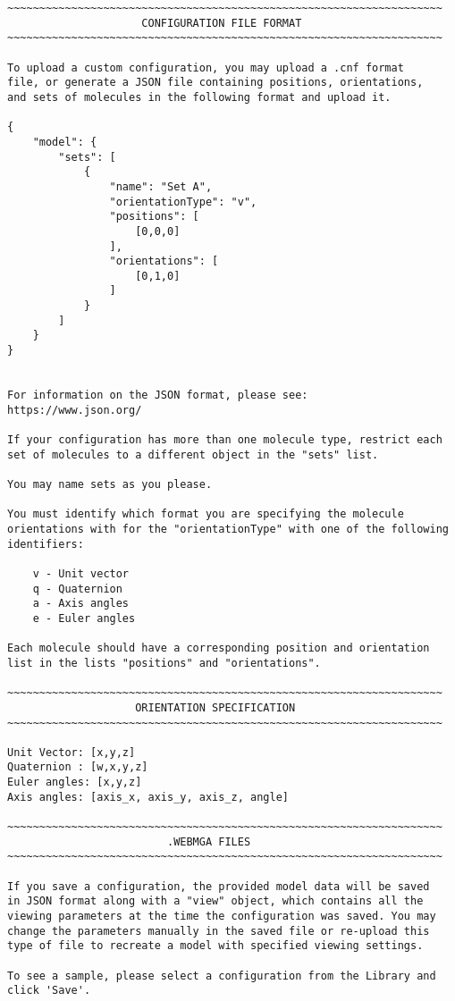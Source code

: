 \begin{verbatim}
~~~~~~~~~~~~~~~~~~~~~~~~~~~~~~~~~~~~~~~~~~~~~~~~~~~~~~~~~~~~~~~~~~~~
                     CONFIGURATION FILE FORMAT
~~~~~~~~~~~~~~~~~~~~~~~~~~~~~~~~~~~~~~~~~~~~~~~~~~~~~~~~~~~~~~~~~~~~

To upload a custom configuration, you may upload a .cnf format
file, or generate a JSON file containing positions, orientations,
and sets of molecules in the following format and upload it.

{
    "model": {
        "sets": [
            {
                "name": "Set A",
                "orientationType": "v",
                "positions": [
                    [0,0,0]
                ],
                "orientations": [
                    [0,1,0]
                ]
            }
        ]
    }
}


For information on the JSON format, please see:
https://www.json.org/

If your configuration has more than one molecule type, restrict each
set of molecules to a different object in the "sets" list.

You may name sets as you please.

You must identify which format you are specifying the molecule
orientations with for the "orientationType" with one of the following
identifiers:

	v - Unit vector
	q - Quaternion
	a - Axis angles
	e - Euler angles

Each molecule should have a corresponding position and orientation
list in the lists "positions" and "orientations".

~~~~~~~~~~~~~~~~~~~~~~~~~~~~~~~~~~~~~~~~~~~~~~~~~~~~~~~~~~~~~~~~~~~~
                    ORIENTATION SPECIFICATION
~~~~~~~~~~~~~~~~~~~~~~~~~~~~~~~~~~~~~~~~~~~~~~~~~~~~~~~~~~~~~~~~~~~~

Unit Vector: [x,y,z]
Quaternion : [w,x,y,z]
Euler angles: [x,y,z]
Axis angles: [axis_x, axis_y, axis_z, angle]

~~~~~~~~~~~~~~~~~~~~~~~~~~~~~~~~~~~~~~~~~~~~~~~~~~~~~~~~~~~~~~~~~~~~
                         .WEBMGA FILES
~~~~~~~~~~~~~~~~~~~~~~~~~~~~~~~~~~~~~~~~~~~~~~~~~~~~~~~~~~~~~~~~~~~~

If you save a configuration, the provided model data will be saved
in JSON format along with a "view" object, which contains all the
viewing parameters at the time the configuration was saved. You may
change the parameters manually in the saved file or re-upload this
type of file to recreate a model with specified viewing settings.

To see a sample, please select a configuration from the Library and
click 'Save'.


\end{verbatim}
